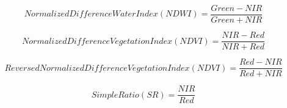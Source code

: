 \begin{equation}\label{eq:ndwi}
    Normalized Difference Water Index (NDWI) = \frac{Green - NIR}{Green + NIR}
\end{equation}

\begin{equation}\label{eq:ndvi}
    Normalized Difference Vegetation Index (NDVI) = \frac{NIR - Red}{NIR + Red}
\end{equation}

\begin{equation}\label{eq:rndvi}
    Reversed Normalized Difference Vegetation Index (NDVI) = \frac{Red - NIR}{Red + NIR}
\end{equation}

\begin{equation}\label{eq:sr}
    Simple Ratio (SR) = \frac{NIR}{Red}
\end{equation}

